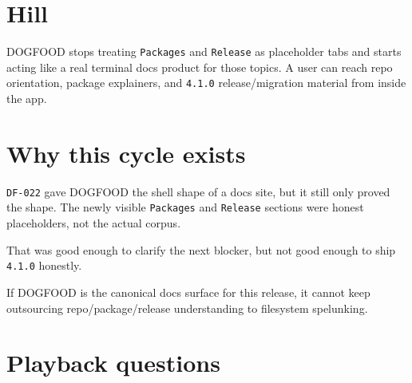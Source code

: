 \section{Hill}\label{record-084-hill}

DOGFOOD stops treating \texttt{P\allowbreak{}a\allowbreak{}c\allowbreak{}k\allowbreak{}a\allowbreak{}g\allowbreak{}e\allowbreak{}s} and \texttt{R\allowbreak{}e\allowbreak{}l\allowbreak{}e\allowbreak{}a\allowbreak{}s\allowbreak{}e} as placeholder tabs and starts acting like a real terminal docs product for those topics. A user can reach repo orientation, package explainers, and \texttt{4\allowbreak{}.\allowbreak{}1\allowbreak{}.\allowbreak{}0} release/migration material from inside the app.

\section{Why this cycle exists}\label{record-084-why-this-cycle-exists}

\texttt{D\allowbreak{}F\allowbreak{}-\allowbreak{}0\allowbreak{}2\allowbreak{}2} gave DOGFOOD the shell shape of a docs site, but it still only proved the shape. The newly visible \texttt{P\allowbreak{}a\allowbreak{}c\allowbreak{}k\allowbreak{}a\allowbreak{}g\allowbreak{}e\allowbreak{}s} and \texttt{R\allowbreak{}e\allowbreak{}l\allowbreak{}e\allowbreak{}a\allowbreak{}s\allowbreak{}e} sections were honest placeholders, not the actual corpus.

That was good enough to clarify the next blocker, but not good enough to ship \texttt{4\allowbreak{}.\allowbreak{}1\allowbreak{}.\allowbreak{}0} honestly.

If DOGFOOD is the canonical docs surface for this release, it cannot keep outsourcing repo/package/release understanding to filesystem spelunking.

\section{Playback questions}\label{record-084-playback-questions}

